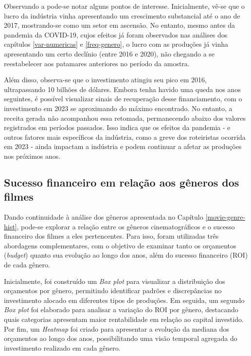 %

Observando a  pode-se notar alguns pontos de interesse. Inicialmente, vê-se que o lucro da indústria vinha apresentando um crescimento substancial até o ano de 2017, mostrando-se como um setor em ascensão. No entanto, mesmo antes da pandemia da COVID-19, cujos efeitos já foram observados nas análises dos capítulos \ref{var-numericas} e \ref{freq-genero}, o lucro com as produções já vinha apresentando um certo declínio (entre 2016 e 2020), não chegando a se reestabelecer aos patamares anteriores no período da amostra.

Além disso, observa-se que o investimento atingiu seu pico em 2016, ultrapassando 10 bilhões de dólares. Embora tenha havido uma queda nos anos seguintes, é possível visualizar sinais de recuperação desse financiamento, com o investimento em 2023 se aproximando do máximo encontrado. No entanto, a receita gerada não acompanhou essa retomada, permanecendo abaixo dos valores registrados em períodos passados. Isso indica que os efeitos da pandemia - e outros fatores mais específicos da indústria, como a greve dos roteiristas \cite{latimes_writers_strike_2023} ocorrida em 2023 - ainda impactam a indústria e podem continuar a afetar as produções nos próximos anos.

\subsection{Sucesso financeiro em relação aos gêneros dos filmes} \label{sucesso-financeiro}

Dando continuidade à análise dos gêneros apresentada no Capítulo \ref{movie-genre-hist}, pode-se explorar a relação entre os gêneros cinematográficos e o sucesso financeiro dos filmes a eles pertencentes. Para isso, foram utilizadas três abordagens complementares, com o objetivo de examinar tanto os orçamentos (\textit{budget}) quanto sua evolução ao longo dos anos, além do sucesso financeiro (\acrshort{ROI}) de cada gênero.

Inicialmente, foi construído um \textit{Box plot} para visualizar a distribuição dos orçamentos por gênero, permitindo identificar padrões e discrepâncias no investimento alocado em diferentes tipos de produções. Em seguida, um segundo \textit{Box plot} foi elaborado para analisar a variação do \acrshort{ROI} por gênero, destacando quais categorias apresentam maior rentabilidade em relação ao capital investido. Por fim, um \textit{Heatmap} foi criado para apresentar a evolução da mediana dos orçamentos ao longo dos anos, possibilitando uma visão temporal agregada do investimento realizado em cada gênero.

